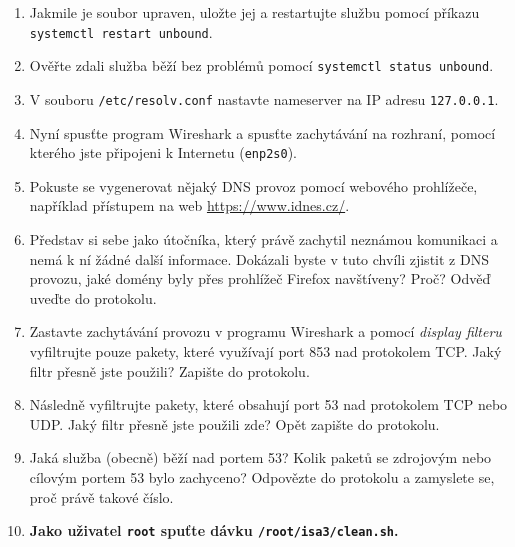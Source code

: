 \begin{enumerate}
    \item Jakmile je soubor upraven, uložte jej a restartujte službu pomocí příkazu \texttt{systemctl restart unbound}.
    \item Ověřte zdali služba běží bez problémů pomocí \texttt{systemctl status unbound}.
    \item V souboru \texttt{/etc/resolv.conf} nastavte nameserver na IP adresu \texttt{127.0.0.1}.
    \item Nyní spusťte program Wireshark a spusťte zachytávání na rozhraní, pomocí kterého jste připojeni k Internetu (\texttt{enp2s0}).
    \item Pokuste se vygenerovat nějaký DNS provoz pomocí webového prohlížeče, například přístupem na web \url{https://www.idnes.cz/}.
	\item Představ si sebe jako útočníka, který právě zachytil neznámou komunikaci a nemá k ní žádné další informace. Dokázali byste v tuto chvíli zjistit z DNS provozu, jaké domény byly přes prohlížeč Firefox navštíveny? Proč? Odvěď uveďte do protokolu.
    \item Zastavte zachytávání provozu v programu Wireshark a pomocí \emph{display filteru} vyfiltrujte pouze pakety, které využívají port 853 nad protokolem TCP. Jaký filtr přesně jste použili? Zapište do protokolu.
    \item Následně vyfiltrujte pakety, které obsahují port 53 nad protokolem TCP nebo UDP. Jaký filtr přesně jste použili zde? Opět zapište do protokolu.
	\item Jaká služba (obecně) běží nad portem 53? Kolik paketů se zdrojovým nebo cílovým portem 53 bylo zachyceno? Odpovězte do protokolu a zamyslete se, proč právě takové číslo.
    \item \textbf{Jako uživatel \texttt{root} spuťte dávku {\tt /root/isa3/clean.sh}.}
\end{enumerate}

